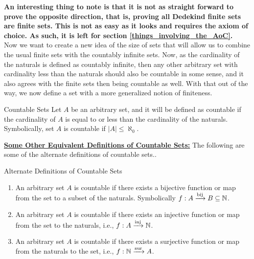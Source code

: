 \noindent \textbf{An interesting thing to note is that it is not as straight forward to prove the opposite direction, that is, proving all Dedekind finite sets are finite sets. This is not as easy as it looks and requires the axiom of choice. As such, it is left for section \eqref{things_involving_the_AoC}.}\\ Now we want to create a new idea of the size of sets that will allow us to combine the usual finite sets with the countably infinite sets. Now, as the cardinality of the naturals is defined as countably infinite, then any other arbitrary set with cardinality less than the naturals should also be countable in some sense, and it also agrees with the finite sets then being countable as well. With that out of the way, we now define a set with a more generalized notion of finiteness.
\begin{Definition}{Countable Sets}\label{countable_sets}
    Let $A$ be an arbitrary set, and it will be defined as countable if the cardinality of $A$ is equal to or less than the cardinality of the naturals. Symbolically, set $A$ is countable if $|A|\leq\aleph_0$.
\end{Definition}
\noindent \underline{\textbf{Some Other Equivalent Definitions of Countable Sets:}} The following are some of the alternate definitions of countable sets..
\begin{Definition}{Alternate Definitions of Countable Sets}\label{alternate_countable_set}
    \begin{enumerate}[leftmargin=0.5cm]
        \item An arbitrary set $A$ is countable if there exists a bijective function or map from the set to a subset of the naturals. Symbolically $f:A\xrightarrow{\rm bij}B\subseteq\mathbb{N}$.
        \item An arbitrary set $A$ is countable if there exists an injective function or map from the set to the naturals, i.e., $f:A\xrightarrow{\rm inj}\mathbb{N}$.
        \item An arbitrary set $A$ is countable if there exists a surjective function or map from the naturals to the set, i.e., $f:\mathbb{N}\xrightarrow{\rm sur}A$.
\end{enumerate}
\end{Definition}

